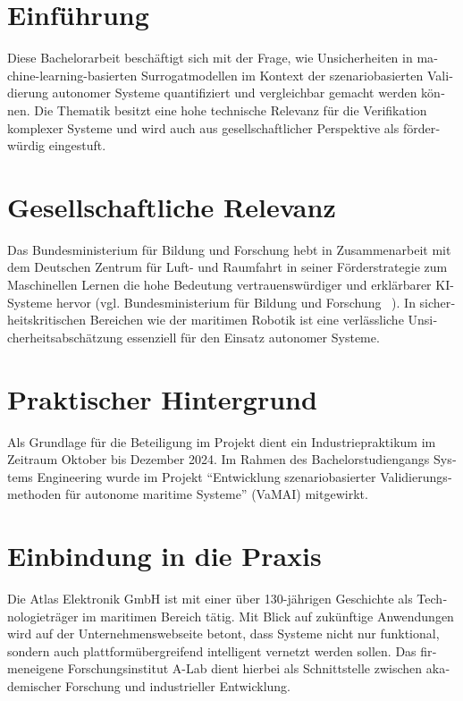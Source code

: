 \begin{otherlanguage}{ngerman}
\section{Einführung}

Diese Bachelorarbeit beschäftigt sich mit der Frage, wie Unsicherheiten in machine-learning-basierten Surrogatmodellen im Kontext der szenariobasierten Validierung autonomer Systeme quantifiziert und vergleichbar gemacht werden können. Die Thematik besitzt eine hohe technische Relevanz für die Verifikation komplexer Systeme und wird auch aus gesellschaftlicher Perspektive als förderwürdig eingestuft.

\section{Gesellschaftliche Relevanz}

Das \gls{Bundesministerium für Bildung und Forschung} hebt in Zusammenarbeit mit dem \gls{Deutschen Zentrum für Luft- und Raumfahrt} in seiner Förderstrategie zum Maschinellen Lernen die hohe Bedeutung vertrauenswürdiger und erklärbarer KI-Systeme hervor (vgl. Bundesministerium für Bildung und Forschung ~\parencite{bmbf2025}). In sicherheitskritischen Bereichen wie der maritimen Robotik ist eine verlässliche Unsicherheitsabschätzung essenziell für den Einsatz autonomer Systeme.

\section{Praktischer Hintergrund}

Als Grundlage für die Beteiligung im Projekt dient ein Industriepraktikum im Zeitraum Oktober bis Dezember 2024. Im Rahmen des Bachelorstudiengangs Systems Engineering wurde im Projekt \enquote{Entwicklung szenariobasierter Validierungsmethoden für autonome maritime Systeme} (VaMAI) mitgewirkt. 

\section{Einbindung in die Praxis}

Die Atlas Elektronik GmbH ist mit einer über 130-jährigen Geschichte als Technologieträger im maritimen Bereich tätig. Mit Blick auf zukünftige Anwendungen wird auf der Unternehmenswebseite betont, dass Systeme nicht nur funktional, sondern auch plattformübergreifend intelligent vernetzt werden sollen. Das firmeneigene Forschungsinstitut A-Lab dient hierbei als Schnittstelle zwischen akademischer Forschung und industrieller Entwicklung.


\end{otherlanguage}
